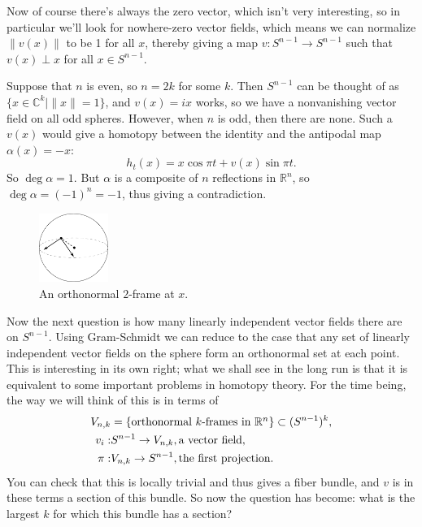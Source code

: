 \documentclass{article}
\newcommand{\C}{\mathbb{C}}
\newcommand{\R}{\mathbb{R}}
\begin{document}
Now of course there's always the zero vector, which isn't very interesting, so in particular we'll look for nowhere-zero vector fields, which means we can normalize $\|v(x)\|$ to be 1 for all $x$, thereby giving a map $v: S^{n-1} \to S^{n-1}$ such that $v(x) \perp x$ for all $x \in S^{n-1}$. %

Suppose that $n$ is even, so $n = 2k$ for some $k$.  Then $S^{n-1}$ can be thought of as $\{x \in \C^k \mid \|x\| = 1\}$, and $v(x) = ix$ works, so we have a nonvanishing vector field on all odd spheres.  However, when $n$ is odd, then there are none.  Such a $v(x)$ would give a homotopy between the identity and the antipodal map $\alpha(x) = -x$: \[h_t(x) = x \cos \pi t + v(x) \sin \pi t.\]  So $\deg \alpha = 1$.  But $\alpha$ is a composite of $n$ reflections in $\R^n$, so $\deg \alpha = (-1)^n = -1$, thus giving a contradiction.

\begin{figure}
\centering\includegraphics[width=0.2\textwidth]{figures/fig2.pdf}
\caption{\small An orthonormal $2$-frame at $x$.}
\end{figure}
Now the next question is how many linearly independent vector fields there are on $S^{n-1}$.  Using Gram-Schmidt we can reduce to the case that any set of linearly independent vector fields on the sphere form an orthonormal set at each point.  This is interesting in its own right; what we shall see in the long run is that it is equivalent to some important problems in homotopy theory.  For the time being, the way we will think of this is in terms of
\begin{align*}
V_{n, k} & = \{\hbox{orthonormal $k$-frames in $\R^n$}\} \subset (S^{n-1})^k, \\
v_i: & S^{n-1} \to V_{n, k}, \hbox{a vector field}, \\ %
\pi: & V_{n, k} \to S^{n-1}, \hbox{the first projection}.
\end{align*}
You can check that this is locally trivial and thus gives a fiber bundle, and $v$ is in these terms a section of this bundle.  So now the question has become: what is the largest $k$ for which this bundle has a section?
\end{document}
